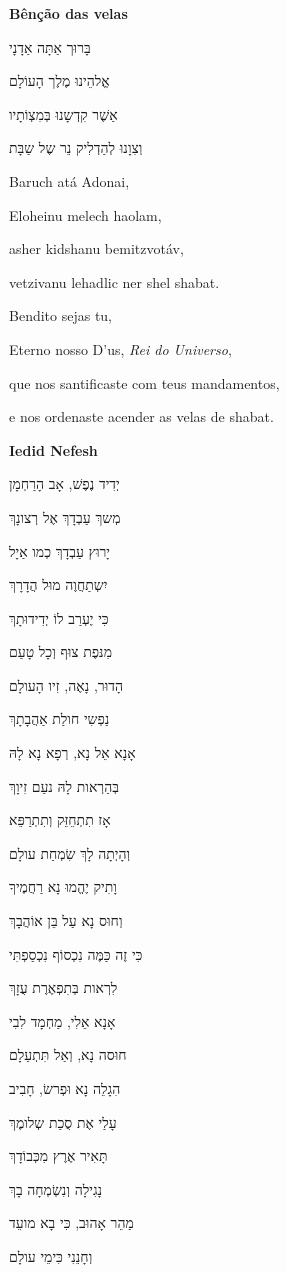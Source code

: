 \textbf{Bênção das velas }

בָּרוּך אַתָּה אַדָנָי

אֱלהֵינוּ מֶלֶך הָעוֹלָם

אַשֶׁר קִדְשָנוּ בְּמִצְוֹתָיו

וְצִוָנוּ לְהַדְלִיק נֵר שֶל שַבָּת‏

Baruch atá Adonai,

Eloheinu melech haolam,

asher kidshanu bemitzvotáv,

vetzivanu lehadlic ner shel shabat.

Bendito sejas tu,

Eterno nosso D'us, \emph{Rei do Universo},

que nos santificaste com teus mandamentos,

e nos ordenaste acender as velas de shabat.

\textbf{Iedid Nefesh}

יְדִיד נֶפֶשׁ, אָב הָרַחְמָן

מְשךְ עַבְדָךְ אֶל רְצונָךְ

יָרוּץ עַבְדָךְ כְמו אַיָל

יִשְתַחֲוֶה מוּל הֲדָרָךְ

כִּי יֶעְרַב לוֹ יְדִידוּתָךְ

מִנּפֶת צוּף וְכָל טָעַם

הָדוּר, נָאֶה, זִיו הָעולָם

נַפְשִי חולַת אַהֲבָתָךְ

אָנָא אֵל נָא, רְפָא נָא לָהּ

בְּהַרְאות לָהּ נעַם זִיוָךְ

אָז תִתְחֵזֵּק וְתִתְרַפֵּא

וְהָיְתָה לָךְ שִׂמְחַת עולָם

וָתִיק יֶהֱמוּ נָא רַחֲמֶיךָ

וְחוּס נָא עַל בֵּן אוֹהֲבָךְ

כִּי זֶה כַּמֶּה נִכְסוֹף נִכְסַפְתִּי

לִרְאות בְּתִפְאֶרֶת עֻזָךְ

אָנָא אֵלִי, מַחְמָד לִבִי

חוּסה נָא, וְאַל תִּתְעַלָם

הִגָלֵה נָא וּפְרשׂ, חָבִיב

עָלַי אֶת סֻכַת שְלומֶךְ

תָּאִיר אֶרֶץ מִכְּבוֹדָךְ

נָגִילָה וְנִשְׂמְחָה בָךְ

מַהֵר אָהוּב, כִּי בָא מועֵד

וְחָנֵנִי כִּימֵי עולָם

